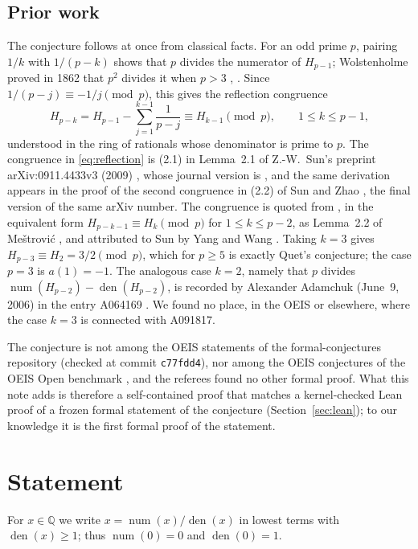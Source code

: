 \documentclass[11pt]{amsart}
\theoremstyle{plain}
\theoremstyle{definition}
\newcommand{\Q}{\mathbb{Q}}
\DeclareMathOperator{\num}{num}
\DeclareMathOperator{\den}{den}
\begin{document}
\subsection*{Prior work}
The conjecture follows at once from classical facts. For an odd prime $p$, pairing $1/k$ with $1/(p-k)$ shows that $p$ divides the numerator of $H_{p-1}$; Wolstenholme proved in 1862 that $p^2$ divides it when $p>3$ \cite{Wol}, \cite[Theorem~115]{HW}. Since $1/(p-j)\equiv-1/j\pmod p$, this gives the reflection congruence
\begin{equation}\label{eq:reflection}
  H_{p-k}=H_{p-1}-\sum_{j=1}^{k-1}\frac1{p-j}\equiv H_{k-1}\pmod p,\qquad 1\le k\le p-1,
\end{equation}
understood in the ring of rationals whose denominator is prime to $p$. The congruence in \eqref{eq:reflection} is (2.1) in Lemma~2.1 of Z.-W.~Sun's preprint arXiv:0911.4433v3 (2009) \cite{Sun-pre}, whose journal version is \cite{Sun}, and the same derivation appears in the proof of the second congruence in (2.2) of Sun and Zhao \cite{SZ}, the final version of the same arXiv number. The congruence is quoted from \cite{Sun-pre,Sun}, in the equivalent form $H_{p-k-1}\equiv H_k\pmod p$ for $1\le k\le p-2$, as Lemma~2.2 of Me\v{s}trovi\'c \cite{Me}, and attributed to Sun \cite{Sun} by Yang and Wang \cite{YW}. Taking $k=3$ gives $H_{p-3}\equiv H_2=3/2\pmod p$, which for $p\ge5$ is exactly Quet's conjecture; the case $p=3$ is $a(1)=-1$. The analogous case $k=2$, namely that $p$ divides $\num(H_{p-2})-\den(H_{p-2})$, is recorded by Alexander Adamchuk (June~9, 2006) in the entry A064169 \cite{A064169}. We found no place, in the OEIS or elsewhere, where the case $k=3$ is connected with A091817.

The conjecture is not among the OEIS statements of the formal-conjectures repository \cite{FC} (checked at commit \texttt{c77fdd4}), nor among the OEIS conjectures of the OEIS Open benchmark \cite{Ad}, and the referees found no other formal proof. What this note adds is therefore a self-contained proof that matches a kernel-checked Lean proof of a frozen formal statement of the conjecture (Section~\ref{sec:lean}); to our knowledge it is the first formal proof of the statement.

\section{Statement}\label{sec:statement}

For $x\in\Q$ we write $x=\num(x)/\den(x)$ in lowest terms with $\den(x)\ge1$; thus $\num(0)=0$ and $\den(0)=1$.
\end{document}
